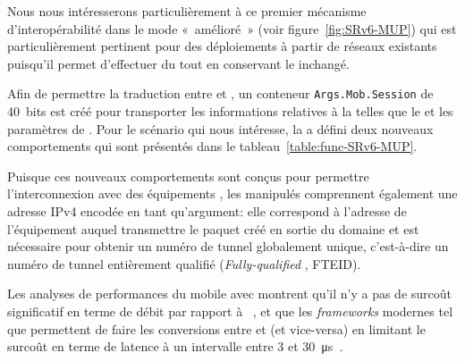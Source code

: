 \documentclass[../main.tex]{subfiles}
\begin{document}
Nous nous intéresserons particulièrement à ce premier mécanisme d’interopérabilité dans le mode « amélioré » (voir figure~\ref{fig:SRv6-MUP}) qui est particulièrement pertinent pour des déploiements à partir de réseaux existants puisqu’il permet d’effectuer du  tout en conservant le  inchangé.
\pagebreak

Afin de permettre la traduction entre  et , un conteneur \texttt{Args.Mob.Session} de 40~bits est créé pour transporter les informations relatives à la  telles que le  et les paramètres de . Pour le scénario qui nous intéresse, la  a défini deux nouveaux comportements qui sont présentés dans le tableau~\ref{table:func-SRv6-MUP}.

Puisque ces nouveaux comportements sont conçus pour permettre l’interconnexion avec des équipements , les  manipulés comprennent également une adresse IPv4 encodée en tant qu’argument: elle correspond à l’adresse de l’équipement auquel transmettre le paquet  créé en sortie du domaine  et est nécessaire pour obtenir un numéro de tunnel globalement unique, c’est-à-dire un numéro de tunnel entièrement qualifié (\textit{Fully-qualified }, FTEID).

\begin{table}[h]
\centering
{}
\caption[Comportements SRv6 pour le plan de données utilisateur des réseaux mobiles]{Dans le mode « amélioré », et avec le mécanisme d'interopérabilité «  non-modifiée utilisant  sur IPv4 », seuls deux nouveaux comportements  sont nécessaires. Il existe des comportements similaires pour fonctionner avec «  sur IPv6 ».}
\label{table:func-SRv6-MUP}
\end{table}

Les analyses de performances du  mobile avec  montrent qu’il n’y a pas de surcoût significatif en terme de débit par rapport à ~\cite{10.1109/ACCESS.2024.3418960}, et que les \textit{frameworks} modernes tel que  permettent de faire les conversions entre  et  (et vice-versa) en limitant le surcoût en terme de latence à un intervalle entre 3 et \SI{30}{\micro\second}~\cite{10.1109/COMPSAC51774.2021.00212}.
\end{document}
